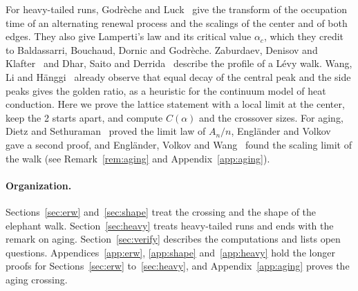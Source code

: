 For heavy-tailed runs, Godr\`eche and Luck~\cite{godrecheluck2001} give the
transform of the occupation time of an alternating renewal process and the
scalings of the center and of both edges. They also give Lamperti's law and
its critical value $\alpha_c$, which they credit to Baldassarri, Bouchaud,
Dornic and Godr\`eche. Zaburdaev, Denisov and Klafter~\cite{zdk2015} and
Dhar, Saito and Derrida~\cite{dsd2013} describe the profile of a L\'evy
walk. Wang, Li and H\"anggi~\cite{wlh2016} already observe that equal decay
of the central peak and the side peaks gives the golden ratio, as a
heuristic for the continuum model of heat conduction. Here we prove the
lattice statement with a local limit at the center, keep the 2 starts apart,
and compute $C(\alpha)$ and the crossover sizes. For aging, Dietz and
Sethuraman~\cite{ds2007} proved the limit law of $A_n/n$, Engl\"ander and
Volkov~\cite{ev2018} gave a second proof, and Engl\"ander, Volkov and
Wang~\cite{evw2020} found the scaling limit of the walk (see
Remark~\ref{rem:aging} and Appendix~\ref{app:aging}).

\paragraph{Organization.}
Sections~\ref{sec:erw} and~\ref{sec:shape} treat the crossing and the shape
of the elephant walk. Section~\ref{sec:heavy} treats heavy-tailed runs and
ends with the remark on aging. Section~\ref{sec:verify} describes the
computations and lists open questions. Appendices~\ref{app:erw},
\ref{app:shape} and~\ref{app:heavy} hold the longer proofs for
Sections~\ref{sec:erw} to~\ref{sec:heavy}, and Appendix~\ref{app:aging}
proves the aging crossing.
